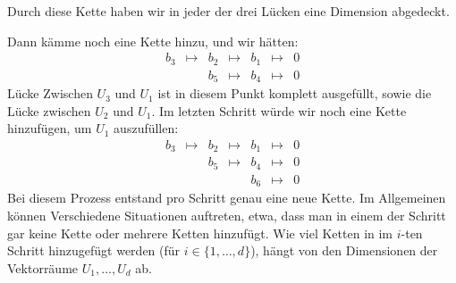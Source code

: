 \begin{bsp}
	Durch diese Kette haben wir in jeder der drei Lücken eine Dimension abgedeckt. 
	
	Dann kämme noch eine Kette hinzu, und wir hätten:  
	\begin{equation*}
\begin{array}{ccccccc}
b_3 & \mapsto & b_2 & \mapsto & b_1 & \mapsto & 0
\\ && b_5 & \mapsto & b_4 & \mapsto & 0
\end{array}
\end{equation*}
Lücke Zwischen $U_3$ und $U_1$ ist in diesem Punkt komplett ausgefüllt, sowie die Lücke zwischen $U_2$ und $U_1$. Im letzten Schritt würde wir noch eine Kette hinzufügen, um $U_1$ auszufüllen:
	\begin{equation*}
\begin{array}{ccccccc}
b_3 & \mapsto & b_2 & \mapsto & b_1 & \mapsto & 0
\\ && b_5 & \mapsto & b_4 & \mapsto & 0
\\ && & & b_6 & \mapsto & 0
\end{array}
\end{equation*}
Bei diesem Prozess entstand pro Schritt genau eine neue Kette. Im Allgemeinen können Verschiedene Situationen auftreten, etwa, dass man in einem der Schritt gar keine Kette oder mehrere Ketten hinzufügt. Wie viel Ketten in im $i$-ten Schritt hinzugefügt werden (für $i \in \{1,\ldots,d\}$), hängt von den Dimensionen der Vektorräume $U_1,\ldots,U_d$ ab. 
\end{bsp}


